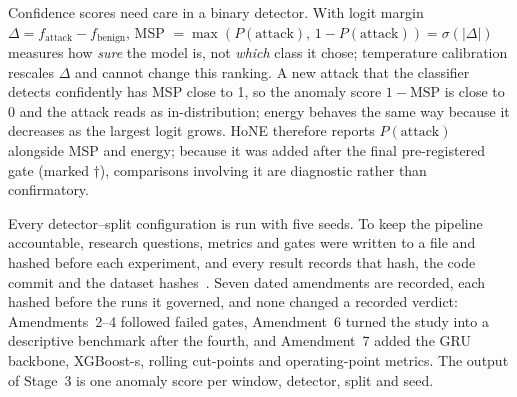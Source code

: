 \documentclass[conference]{IEEEtran}
\begin{document}
Confidence scores need care in a binary detector. With logit margin $\Delta=f_{\text{attack}}-f_{\text{benign}}$, MSP $=\max(P(\text{attack}),\,1-P(\text{attack}))=\sigma(|\Delta|)$ measures how \emph{sure} the model is, not \emph{which} class it chose; temperature calibration rescales $\Delta$ and cannot change this ranking. A new attack that the classifier detects confidently has MSP close to 1, so the anomaly score $1-\text{MSP}$ is close to 0 and the attack reads as in-distribution; energy behaves the same way because it decreases as the largest logit grows. HoNE therefore reports $P(\text{attack})$ alongside MSP and energy; because it was added after the final pre-registered gate (marked $\dagger$), comparisons involving it are diagnostic rather than confirmatory.

Every detector--split configuration is run with five seeds. To keep the pipeline accountable, research questions, metrics and gates were written to a file and hashed before each experiment, and every result records that hash, the code commit and the dataset hashes~\cite{nosek2018}. Seven dated amendments are recorded, each hashed before the runs it governed, and none changed a recorded verdict: Amendments~2--4 followed failed gates, Amendment~6 turned the study into a descriptive benchmark after the fourth, and Amendment~7 added the GRU backbone, XGBoost-s, rolling cut-points and operating-point metrics. The output of Stage~3 is one anomaly score per window, detector, split and seed.
\end{document}
